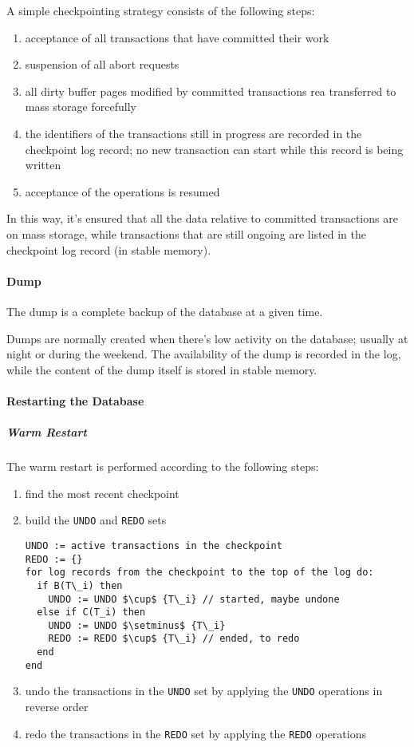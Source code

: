 \documentclass[english]{article}
\begin{document}
A simple checkpointing strategy consists of the following steps:

\begin{enumerate}
  \item acceptance of all transactions that have committed their work
  \item suspension of all abort requests
  \item all dirty buffer pages modified by committed transactions rea transferred to mass storage forcefully
  \item the identifiers of the transactions still in progress are recorded in the checkpoint log record; no new transaction can start while this record is being written
  \item acceptance of the operations is resumed
\end{enumerate}

In this way, it's ensured that all the data relative to committed transactions are on mass storage, while transactions that are still ongoing are listed in the checkpoint log record (in stable memory).

\paragraph{Dump}

The dump is a complete backup of the database at a given time.

Dumps are normally created when there's low activity on the database; usually at night or during the weekend.
The availability of the dump is recorded in the log, while the content of the dump itself is stored in stable memory.

\paragraph{Restarting the Database}

\subparagraph*{Warm Restart}
The warm restart is performed according to the following steps:

\begin{enumerate}
  \item find the most recent checkpoint
  \item build the \texttt{UNDO} and \texttt{REDO} sets
        \begin{lstlisting}
UNDO := active transactions in the checkpoint
REDO := {}
for log records from the checkpoint to the top of the log do:
  if B(T\_i) then
    UNDO := UNDO $\cup$ {T\_i} // started, maybe undone
  else if C(T_i) then
    UNDO := UNDO $\setminus$ {T\_i}
    REDO := REDO $\cup$ {T\_i} // ended, to redo
  end
end
  \end{lstlisting}
  \item undo the transactions in the \texttt{UNDO} set by applying the \texttt{UNDO} operations in reverse order
  \item redo the transactions in the \texttt{REDO} set by applying the \texttt{REDO} operations
\end{enumerate}
\end{document}
